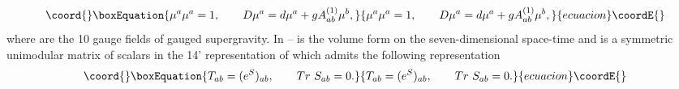 \documentclass[a4paper,11pt]{article}
\begin{document}
\begin{equation}\coord{}\boxEquation{\plabel{defs}
\mu^a\mu^a=1,\qquad D\mu^a=d\mu^a+g A^{(1)}_{ab}\mu^b,
}{\mu^a\mu^a=1,\qquad D\mu^a=d\mu^a+g A^{(1)}_{ab}\mu^b,
}{ecuacion}\coordE{}\end{equation}
where \coordHE{} are the 10 gauge fields of \coordHE{}  \coordHE{} gauged
supergravity. In  --  \coordHE{} is the
volume form on the seven-dimensional space-time and \coordHE{} is
a symmetric unimodular matrix of scalars in the 14'
representation of \coordHE{} which admits the following
representation
\begin{equation}\coord{}\boxEquation{\plabel{Treps}
T_{ab}=(e^{S})_{ab},\qquad Tr~ S_{ab}=0.
}{T_{ab}=(e^{S})_{ab},\qquad Tr~ S_{ab}=0.
}{ecuacion}\coordE{}\end{equation}
\end{document}
